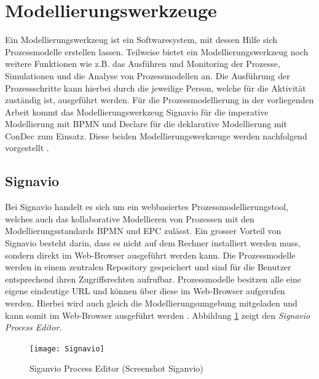 \section{Modellierungswerkzeuge}\label{sec:chapter3:Modellierungswerkzeuge}
Ein Modellierungswerkzeug ist ein Softwaresystem, mit dessen Hilfe sich Prozessmodelle erstellen  lassen. Teilweise bietet ein Modellierungswerkzeug noch weitere Funktionen wie z.B. das Ausführen und Monitoring der Prozesse, Simulationen und die Analyse von Prozessmodellen an. Die Ausführung der Prozessschritte kann hierbei durch die jeweilige Person, welche für die Aktivität zuständig ist, ausgeführt werden. Für die Prozessmodellierung in der vorliegenden Arbeit kommt das Modellierungswerkzeug Signavio für die imperative Modellierung mit BPMN und Declare für die deklarative Modellierung mit ConDec zum Einsatz. Diese beiden Modellierungswerkzeuge werden nachfolgend vorgestellt \cite{gadatsch2012}.

\subsection{Signavio}

Bei Signavio handelt es sich um ein webbasiertes Prozessmodellierungstool, welches auch das kollaborative Modellieren von Prozessen mit den Modellierungsstandards BPMN und EPC zulässt. Ein grosser Vorteil von Signavio besteht darin, dass es nicht auf dem Rechner installiert werden muss, sondern direkt im Web-Browser ausgeführt werden kann. Die Prozessmodelle werden in einem zentralen Repository gespeichert und sind für die Benutzer entsprechend ihren Zugriffsrechten aufrufbar. Prozessmodelle besitzen alle eine eigene eindeutige URL und können über diese im Web-Browser aufgerufen werden. Hierbei wird auch gleich die Modellierungsumgebung mitgeladen und kann somit im Web-Browser ausgeführt werden \cite{quteprints}. Abbildung \ref{fig:Signavio} zeigt den \textit{Signavio Process Editor}.

\begin{figure}[H]
\begin{center}
  \texttt{[image: Signavio]} %
  \caption{Siganvio Process Editor (Screenshot Siganvio)}
  \label{fig:Signavio}
\end{center}
\end{figure} 

